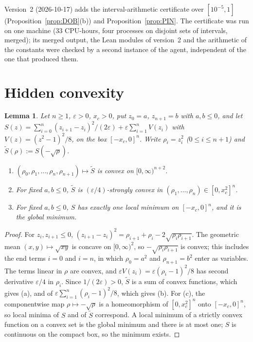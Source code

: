 \documentclass[11pt,a4paper]{article}
\newtheorem{lemma}[theorem]{Lemma}
\theoremstyle{definition}
\theoremstyle{remark}
\newcommand{\xc}{x_c}
\begin{document}
Version~2 (2026-10-17) adds the interval-arithmetic certificate over $[10^{-5},1]$ (Proposition~\ref{prop:DOB}(b)) and Proposition~\ref{prop:PIN}. The certificate was run on one machine ($33$ CPU-hours, four processes on disjoint sets of intervals, merged); its merged output, the Lean modules of version~2 and the arithmetic of the constants were checked by a second instance of the agent, independent of the one that produced them.

\appendix
\section{Hidden convexity}\label{app:K}

\begin{lemma}\label{lem:K}
Let $n\ge1$, $\varepsilon>0$, $\xc>0$, put $z_0=a$, $z_{n+1}=b$ with $a,b\le0$, and let $S(z)=\sum_{i=0}^{n}(z_{i+1}-z_i)^2/(2\varepsilon)+\varepsilon\sum_{i=1}^{n}V(z_i)$ with $V(z)=(z^2-1)^2/8$, on the box $[-\xc,0]^n$. Write $\rho_i=z_i^2$ ($0\le i\le n+1$) and $\tilde S(\rho):=S(-\sqrt\rho)$.
\begin{enumerate}[label=(\alph*)]
\item $(\rho_0,\rho_1,\dots,\rho_n,\rho_{n+1})\mapsto\tilde S$ is convex on $[0,\infty)^{n+2}$.
\item For fixed $a,b\le0$, $\tilde S$ is $(\varepsilon/4)$-strongly convex in $(\rho_1,\dots,\rho_n)\in[0,\xc^2]^n$.
\item For fixed $a,b\le0$, $S$ has exactly one local minimum on $[-\xc,0]^n$, and it is the global minimum.
\end{enumerate}
\end{lemma}

\begin{proof}
For $z_i,z_{i+1}\le0$, $(z_{i+1}-z_i)^2=\rho_{i+1}+\rho_i-2\sqrt{\rho_i\rho_{i+1}}$. The geometric mean $(x,y)\mapsto\sqrt{xy}$ is concave on $[0,\infty)^2$, so $-\sqrt{\rho_i\rho_{i+1}}$ is convex; this includes the end terms $i=0$ and $i=n$, in which $\rho_0=a^2$ and $\rho_{n+1}=b^2$ enter as variables. The terms linear in $\rho$ are convex, and $\varepsilon V(z_i)=\varepsilon(\rho_i-1)^2/8$ has second derivative $\varepsilon/4$ in $\rho_i$. Since $1/(2\varepsilon)>0$, $\tilde S$ is a sum of convex functions, which gives (a), and of $\varepsilon\sum_{i=1}^n(\rho_i-1)^2/8$, which gives (b). For (c), the componentwise map $\rho\mapsto-\sqrt\rho$ is a homeomorphism of $[0,\xc^2]^n$ onto $[-\xc,0]^n$, so local minima of $S$ and of $\tilde S$ correspond. A local minimum of a strictly convex function on a convex set is the global minimum and there is at most one; $S$ is continuous on the compact box, so the minimum exists.
\end{proof}
\end{document}

